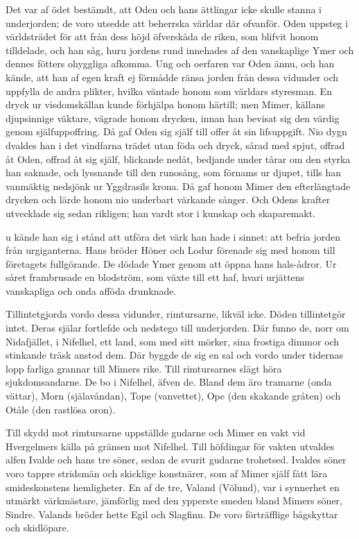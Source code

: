 Det var af ödet bestämdt, att Oden och hans ättlingar icke skulle stanna
i underjorden; de voro utsedde att beherrska världar där ofvanför. Oden
uppsteg i världsträdet för att från dess höjd öfverskåda de riken, som
blifvit honom tilldelade, och han såg, huru jordens rund innehades af
den vanskaplige Ymer och dennes fötters ohyggliga afkomma. Ung och
oerfaren var Oden ännu, och han kände, att han af egen kraft ej förmådde
ränsa jorden från dessa vidunder och uppfylla de andra plikter, hvilka
väntade honom som världars styresman. En dryck ur visdomskällan kunde
förhjälpa honom härtill; men Mimer, källans djupsinnige väktare, vägrade
honom drycken, innan han bevisat sig den värdig genom själfuppoffring.
Då gaf Oden sig själf till offer åt sin lifsuppgift. Nio dygn dvaldes
han i det vindfarna trädet utan föda och dryck, sårad med spjut, offrad
åt Oden, offrad åt sig själf, blickande nedåt, bedjande under tårar om den styrka han
saknade, och lyssnande till den runosång, som förnams ur djupet, tills
han vanmäktig nedsjönk ur Yggdrasils krona. Då gaf honom Mimer den
efterlängtade drycken och lärde honom nio underbart värkande sånger. Och
Odens krafter utvecklade sig sedan rikligen; han vardt stor i kunskap
och skaparemakt.

\endSecII


\dropcapN u kände han sig i stånd att utföra det värk han hade i sinnet: att
befria jorden från urgiganterna. Hans bröder Höner och Lodur förenade
sig med honom till företagets fullgörande. De dödade Ymer genom att
öppna hans hals-ådror. Ur såret frambrusade en blodström, som växte till
ett haf, hvari urjättens vanskapliga och onda afföda drunknade.

Tillintetgjorda vordo dessa vidunder, rimtursarne, likväl icke. Döden
tillintetgör intet. Deras själar fortlefde och nedstego till
underjorden. Där funno de, norr om Nidafjället, i Nifelhel, ett land,
som med sitt mörker, sina frostiga dimmor och stinkande träsk anstod
dem. Där byggde de sig en sal och vordo under tidernas lopp farliga
grannar till Mimers rike. Till rimtursarnes slägt höra sjukdomsandarne.
De bo i Nifelhel, äfven de. Bland dem äro tramarne (onda vättar), Morn
(själavåndan), Tope (vanvettet), Ope (den skakande gråten) och Otåle
(den rastlösa oron).

Till skydd mot rimtursarne uppställde gudarne och Mimer en vakt vid
Hvergelmers källa på gränsen mot Nifelhel. Till höfdingar för vakten
utvaldes alfen Ivalde och hans tre söner, sedan de svurit gudarne
trohetsed. Ivaldes söner voro tappre stridsmän och skicklige konstnärer,
som af Mimer själf fått lära smideskonstens hemligheter. En af de tre,
Valand (Völund), var i synnerhet en utmärkt värkmästare, jämförlig
med den ypperste smeden bland Mimers söner, Sindre. Valands bröder hette
Egil och Slagfinn. De voro förträfflige bågskyttar och skidlöpare.

